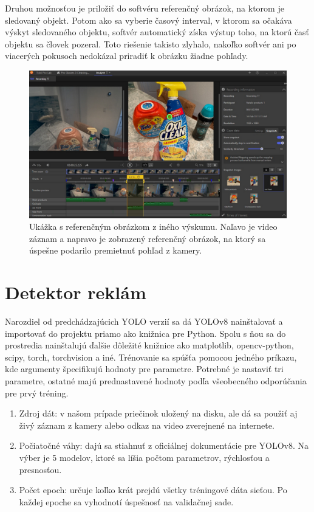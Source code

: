 Druhou možnosťou je priložiť do softvéru referenčný obrázok, na ktorom je sledovaný objekt. Potom ako sa vyberie časový interval, v ktorom sa očakáva výskyt sledovaného objektu, softvér automatický získa výstup toho, na ktorú časť objektu sa človek pozeral. Toto riešenie takisto zlyhalo, nakoľko softvér ani po viacerých pokusoch nedokázal priradiť k obrázku žiadne pohľady.
\\
\begin{figure}[ht]
    \centering
    \includegraphics[width=1\textwidth]{images/04/snapshot.png}
    \caption{Ukážka s referenčným obrázkom z iného výskumu. Naľavo je video záznam a napravo je zobrazený referenčný obrázok, na ktorý sa úspešne podarilo premietnuť pohľad z kamery.}
    \label{img:lab}
\end{figure}


\section{Detektor reklám}

Narozdiel od predchádzajúcich YOLO verzií sa dá YOLOv8 nainštalovať a importovať do projektu priamo ako knižnica pre Python. Spolu s ňou sa do prostredia nainštalujú ďalšie dôležité knižnice ako matplotlib, opencv-python, scipy, torch, torchvision a iné. Trénovanie sa spúšťa pomocou jedného príkazu, kde argumenty špecifikujú hodnoty pre parametre. Potrebné je nastaviť tri parametre, ostatné majú prednastavené hodnoty podľa všeobecného odporúčania pre prvý tréning.

\begin{enumerate}
    \item Zdroj dát: v našom prípade priečinok uložený na disku, ale dá sa použiť aj živý záznam z kamery alebo odkaz na video zverejnené na internete.
    \item Počiatočné váhy: dajú sa stiahnuť z oficiálnej dokumentácie pre YOLOv8. Na výber je 5 modelov, ktoré sa líšia počtom parametrov, rýchlosťou a presnosťou.
    \item Počet epoch: určuje koľko krát prejdú všetky tréningové dáta sieťou. Po každej epoche sa vyhodnotí úspešnosť na validačnej sade.
\end{enumerate}

